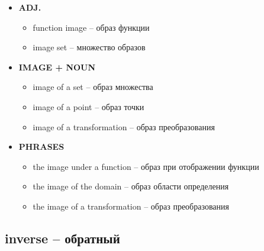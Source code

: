\documentclass[a4paper, 10pt]{article}
\theoremstyle{definition}
\theoremstyle{plain}
\theoremstyle{remark}
\begin{document}
\begin{itemize}
    \item \textbf{ADJ.}
    \begin{itemize}
        \item function image – образ функции
        \item image set – множество образов
    \end{itemize}
    
    \item \textbf{IMAGE + NOUN}
    \begin{itemize}
        \item image of a set – образ множества
        \item image of a point – образ точки
        \item image of a transformation – образ преобразования
    \end{itemize}
    
    \item \textbf{PHRASES}
    \begin{itemize}
        \item the image under a function – образ при отображении функции
        \item the image of the domain – образ области определения
        \item the image of a transformation – образ преобразования
    \end{itemize}
\end{itemize}

\subsection{inverse – обратный}
\end{document}
